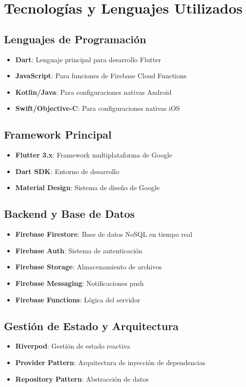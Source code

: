 \documentclass[12pt,a4paper]{article}
\begin{document}
\section{Tecnologías y Lenguajes Utilizados}

\subsection{Lenguajes de Programación}
\begin{itemize}[itemsep=0.5em]
    \item \textbf{Dart}: Lenguaje principal para desarrollo Flutter
    \item \textbf{JavaScript}: Para funciones de Firebase Cloud Functions
    \item \textbf{Kotlin/Java}: Para configuraciones nativas Android
    \item \textbf{Swift/Objective-C}: Para configuraciones nativas iOS
\end{itemize}

\subsection{Framework Principal}
\begin{itemize}[itemsep=0.5em]
    \item \textbf{Flutter 3.x}: Framework multiplataforma de Google
    \item \textbf{Dart SDK}: Entorno de desarrollo
    \item \textbf{Material Design}: Sistema de diseño de Google
\end{itemize}

\subsection{Backend y Base de Datos}
\begin{itemize}[itemsep=0.5em]
    \item \textbf{Firebase Firestore}: Base de datos NoSQL en tiempo real
    \item \textbf{Firebase Auth}: Sistema de autenticación
    \item \textbf{Firebase Storage}: Almacenamiento de archivos
    \item \textbf{Firebase Messaging}: Notificaciones push
    \item \textbf{Firebase Functions}: Lógica del servidor
\end{itemize}

\subsection{Gestión de Estado y Arquitectura}
\begin{itemize}[itemsep=0.5em]
    \item \textbf{Riverpod}: Gestión de estado reactiva
    \item \textbf{Provider Pattern}: Arquitectura de inyección de dependencias
    \item \textbf{Repository Pattern}: Abstracción de datos
\end{itemize}
\end{document}
